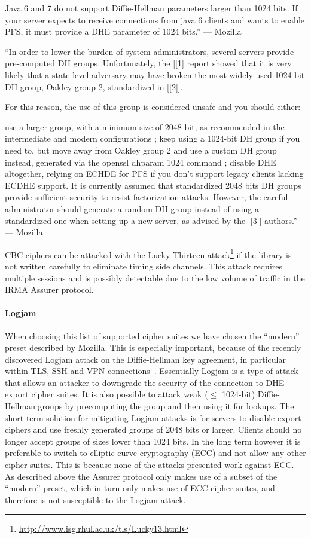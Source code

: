 Java 6 and 7 do not support Diffie-Hellman parameters larger than 1024 bits. If your server expects to receive connections from java 6 clients and wants to enable PFS, it must provide a DHE parameter of 1024 bits.'' --- Mozilla

``In order to lower the burden of system administrators, several servers provide pre-computed DH groups. Unfortunately, the [[1] report showed that it is very likely that a state-level adversary may have broken the most widely used 1024-bit DH group, Oakley group 2, standardized in [[2]].

For this reason, the use of this group is considered unsafe and you should either:

use a larger group, with a minimum size of 2048-bit, as recommended in the intermediate and modern configurations ;
keep using a 1024-bit DH group if you need to, but move away from Oakley group 2 and use a custom DH group instead, generated via the openssl dhparam 1024 command ;
disable DHE altogether, relying on ECHDE for PFS if you don't support legacy clients lacking ECDHE support.
It is currently assumed that standardized 2048 bits DH groups provide sufficient security to resist factorization attacks. However, the careful administrator should generate a random DH group instead of using a standardized one when setting up a new server, as advised by the [[3]] authors.'' --- Mozilla

CBC ciphers can be attacked with the Lucky Thirteen attack\footnote{\url{http://www.isg.rhul.ac.uk/tls/Lucky13.html}} if the library is not written carefully to eliminate timing side channels. This attack requires multiple sessions and is possibly detectable due to the low volume of traffic in the IRMA Assurer protocol.

\paragraph{Logjam}
When choosing this list of supported cipher suites we have chosen the ``modern'' preset described by Mozilla. This is especially important, because of the recently discovered Logjam attack on the Diffie-Hellman key agreement, in particular within TLS, SSH and VPN connections~\cite{logjam}. Essentially Logjam is a type of attack that allows an attacker to downgrade the security of the connection to DHE export cipher suites. It is also possible to attack weak ($\leq$ 1024-bit) Diffie-Hellman groups by precomputing the group and then using it for lookups. The short term solution for mitigating Logjam attacks is for servers to disable export ciphers and use freshly generated groups of 2048 bits or larger. Clients should no longer accept groups of sizes lower than 1024 bits. In the long term however it is preferable to switch to elliptic curve cryptography (ECC) and not allow any other cipher suites. This is because none of the attacks presented work against ECC. As described above the Assurer protocol only makes use of a subset of the ``modern'' preset, which in turn only makes use of ECC cipher suites, and therefore is not susceptible to the Logjam attack.


